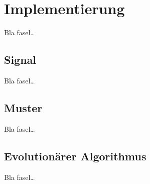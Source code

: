 
\chapter{Implementierung}
\label{ch:Implementierung}
Bla fasel\ldots

\section{Signal}
\label{ch:Implementierung:sec:Signal}

Bla fasel\ldots



\section{Muster}
\label{ch:Implementierung:sec:Muster}

Bla fasel\ldots




\section{Evolutionärer Algorithmus}
\label{ch:Implementierung:sec:Evolutionärer Algorithmus}

Bla fasel\ldots



